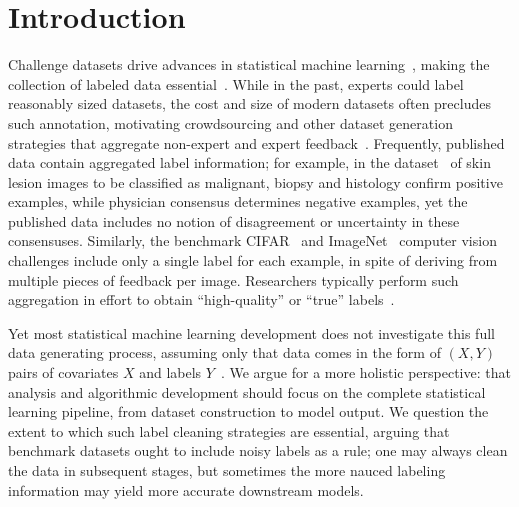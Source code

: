 
\section{Introduction}

Challenge datasets drive advances in statistical machine
learning~\cite{MarcusSaMa94, LewisYaRoLi04, AsuncionNe07, KrizhevskyHi09,
  DengDoSoLiLiFe09, RussakovskyDeSuKrSaMaHuKaKhBeBeFe15},
making the collection of
labeled data essential~\cite{Donoho17}.
%
While in the past, experts could label reasonably sized datasets, the cost
and size of modern datasets often precludes such annotation, motivating
crowdsourcing and other dataset generation strategies that aggregate
non-expert and expert feedback~\citep{DawidSk79,
  WhitehillWuBeMoRu09, RussakovskyDeSuKrSaMaHuKaKhBeBeFe15,
  CodellaRoTsCeDuGuHeKaLiMa19, GadreEtAl23}.
%
Frequently, published data contain aggregated label information; for
example, in the dataset~\cite{CodellaRoTsCeDuGuHeKaLiMa19}
of skin lesion images to be classified as
malignant, biopsy and histology confirm positive examples, while physician
consensus determines negative examples, yet the published data includes no
notion of disagreement or uncertainty in these consensuses.
%
Similarly, the benchmark CIFAR~\citep{KrizhevskyHi09} and
ImageNet~\citep{DengDoSoLiLiFe09, RussakovskyDeSuKrSaMaHuKaKhBeBeFe15}
computer vision challenges include only a single label for each example, in
spite of deriving from multiple pieces of feedback per image.
%
Researchers typically perform such aggregation in effort to obtain
``high-quality'' or ``true'' labels~\cite{DengDoSoLiLiFe09,
  RussakovskyDeSuKrSaMaHuKaKhBeBeFe15, DawidSk79,
  WhitehillWuBeMoRu09}.

Yet most statistical machine learning development does not investigate this
full data generating process, assuming only that data comes in the form of
$(X, Y)$ pairs of covariates $X$ and labels $Y$~\cite{Vapnik95,
  BoucheronBoLu05, BartlettJoMc06, HastieTiFr09}.
%
We argue for a more
holistic perspective: that analysis and algorithmic development should focus
on the complete statistical learning pipeline, from dataset construction to
model output.
%
We question the extent to which such label cleaning strategies are
essential, arguing that benchmark datasets ought to include noisy labels as
a rule; one may always clean the data in subsequent stages, but sometimes
the more nauced labeling information may yield more accurate downstream
models.

